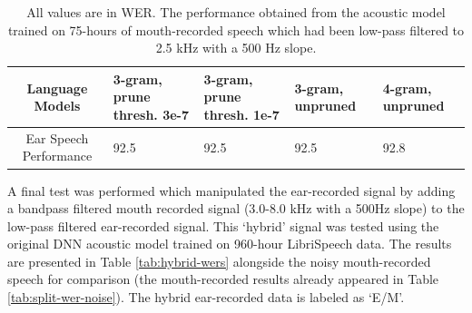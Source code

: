 \begin{table}[h]
\begin{center}
\begin{tabular}{|c||p{2cm}|p{2cm}|p{2cm}|p{2cm}|} \hline
 Language Models & 3-gram, prune thresh. 3e-7 & 3-gram, prune thresh. 1e-7 & 3-gram, unpruned & 4-gram, unpruned \\ \hline\hline
 Ear Speech Performance & 92.5 & 92.5 & 92.5 & 92.8 \\ \hline
\end{tabular}
\end{center}
\caption{All values are in WER. The performance obtained from the acoustic model trained on 75-hours of mouth-recorded speech which had been low-pass filtered to 2.5 kHz with a 500 Hz slope.}\label{tab:retrainedGMM}
\end{table}

A final test was performed which manipulated the ear-recorded signal by adding a bandpass filtered mouth recorded signal (3.0-8.0 kHz with a 500Hz slope) to the low-pass filtered ear-recorded signal.  This `hybrid' signal was tested using the original DNN acoustic model trained on 960-hour LibriSpeech data.  The results are presented in Table \ref{tab:hybrid-wers} alongside the noisy mouth-recorded speech for comparison (the mouth-recorded results already appeared in Table \ref{tab:split-wer-noise}).  The hybrid ear-recorded data is labeled as `E/M'.


